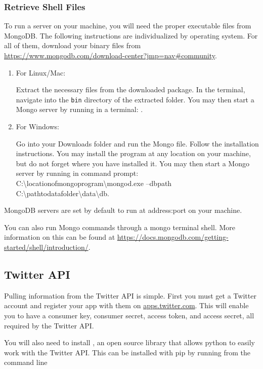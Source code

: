 \subsubsection*{Retrieve Shell Files}
To run a server on your machine, you will need the proper executable files from MongoDB.
The following instructions are individualized by operating system.
For all of them, download your binary files from \url{https://www.mongodb.com/download-center?jmp=nav#community}.

\begin{enumerate}
\item For Linux/Mac:

Extract the necessary files from the downloaded package.
In the terminal, navigate into the \texttt{bin} directory of the extracted folder.
You may then start a Mongo server by running in a terminal: .

\item For Windows:

Go into your Downloads folder and run the Mongo  file.
Follow the installation instructions.
You may install the program at any location on your machine, but do not forget where you have installed it.
You may then start a Mongo server by running in command prompt: C:\textbackslash locationofmongoprogram\textbackslash mongod.exe --dbpath C:\textbackslash pathtodatafolder\textbackslash data\textbackslash db.
\end{enumerate}

MongoDB servers are set by default to run at address:port  on your machine.

You can also run Mongo commands through a mongo terminal shell.
More information on this can be found at \url{https://docs.mongodb.com/getting-started/shell/introduction/}.

\subsection*{Twitter API}

Pulling information from the Twitter API is simple.
First you must get a Twitter account and register your app with them on \url{apps.twitter.com}.
This will enable you to have a consumer key, consumer secret, access token, and access secret, all required by the Twitter API.

You will also need to install , an open source library that allows python to easily work with the Twitter API. This can be installed with pip by running from the command line

